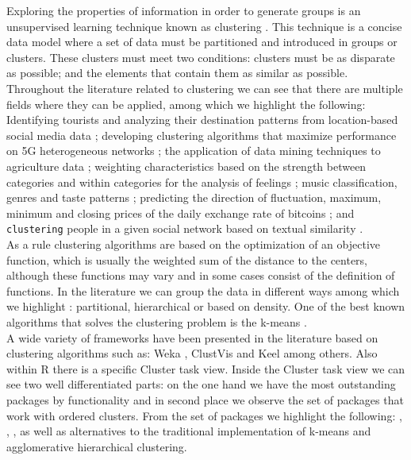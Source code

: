 Exploring the properties of information in order to generate groups is an unsupervised learning technique known as clustering \citep{b46} \citep{b47}. This technique is a concise data model where a set of data must be partitioned and introduced in groups or clusters. These clusters must meet two conditions: clusters must be as disparate as possible; and the elements that contain them as similar as possible. Throughout the literature related to clustering we can see that there are multiple fields where they can be applied, among which we highlight the following: Identifying tourists and analyzing their destination patterns from location-based social media data \citep{b1}; developing clustering algorithms that maximize performance on 5G heterogeneous networks \citep{b2}; the application of data mining techniques to agriculture data \citep{b3}; weighting characteristics based on the strength between categories and within categories for the analysis of feelings \citep{b4}; music classification, genres and taste patterns \citep{b5}; predicting the direction of fluctuation, maximum, minimum and closing prices of the daily exchange rate of bitcoins \citep{b6}; and \texttt{clustering}  people in a given social network based on textual similarity \citep{b7}.\\
As a rule clustering algorithms are based on the optimization of an objective function, which is usually the weighted sum of the distance to the centers, although these functions may vary and in some cases consist of the definition of functions. In the literature we can group the data in different ways among which we highlight \citep{b48}: partitional, hierarchical or based on density. One of the best known algorithms that solves the clustering problem is the k-means \citep{b49}.\\
A wide variety of frameworks have been presented in the literature based on clustering algorithms such as: Weka \citep{b13}, ClustVis \citep{b14} and Keel \citep{b15} among others. Also within R there is a specific Cluster task view. Inside the Cluster task view we can see two well differentiated parts: on the one hand we have the most outstanding packages by functionality and in second place we observe the set of packages that work with ordered clusters. From the set of packages we highlight the following:  \citep{b9},  \citep{b10},  \citep{b11},  \citep{b12} as well as alternatives to the traditional implementation of k-means and agglomerative hierarchical clustering.\\
